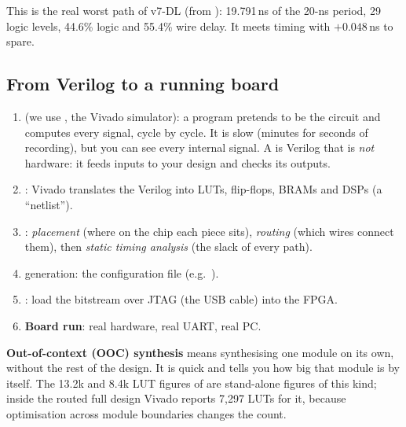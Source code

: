 \documentclass[11pt]{article}
\newcommand{\mods}[1]{\texttt{\detokenize{#1}}}   %
\begin{document}
\begin{center}
\end{center}
This is the real worst path of v7-DL (from ): 19.791\,ns of the 20-ns period, 29 logic levels, 44.6\% logic and 55.4\% wire delay. It meets timing with $+0.048$\,ns to spare.

\subsection{From Verilog to a running board}
\begin{enumerate}
  \item {} (we use , the Vivado simulator): a program pretends to be the circuit and computes every signal, cycle by cycle. It is slow (minutes for seconds of recording), but you can see every internal signal. A  is Verilog that is \emph{not} hardware: it feeds inputs to your design and checks its outputs.
  \item {}: Vivado translates the Verilog into LUTs, flip-flops, BRAMs and DSPs (a ``netlist'').
  \item {}: \emph{placement} (where on the chip each piece sits), \emph{routing} (which wires connect them), then \emph{static timing analysis} (the slack of every path).
  \item {} generation: the configuration file (e.g.\ ).
  \item {}: load the bitstream over JTAG (the USB cable) into the FPGA.
  \item \textbf{Board run}: real hardware, real UART, real PC.
\end{enumerate}
\textbf{Out-of-context (OOC) synthesis} means synthesising one module on its own, without the rest of the design. It is quick and tells you how big that module is by itself. The 13.2k and 8.4k LUT figures of \mods{v7_la} are stand-alone figures of this kind; inside the routed full design Vivado reports 7,297 LUTs for it, because optimisation across module boundaries changes the count.
\end{document}
